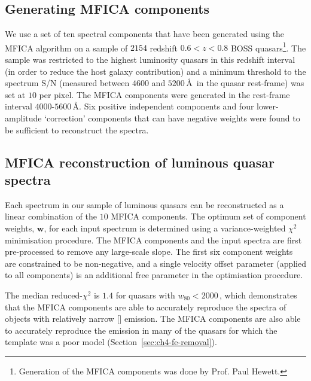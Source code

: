 \subsection{Generating MFICA components}

We use a set of ten spectral components that have been generated using the MFICA algorithm on a sample of $2154$ redshift $0.6 < z < 0.8$ BOSS quasars\footnote{Generation of the MFICA components was done by Prof. Paul Hewett.}.
The sample was restricted to the highest luminosity quasars in this redshift interval (in order to reduce the host galaxy contribution) and a minimum threshold to the spectrum S/N (measured between $4600$ and $5200$\,\AA\, in the quasar rest-frame) was set at $10$ per pixel.
The MFICA components were generated in the rest-frame interval $4000$-$5600$\,\AA.
Six positive independent components and four lower-amplitude `correction' components that can have negative weights were found to be sufficient to reconstruct the spectra. 

\subsection{MFICA reconstruction of luminous quasar spectra}

Each spectrum in our sample of luminous quasars can be reconstructed as a linear combination of the $10$ MFICA components. 
The optimum set of component weights, $\mathbf{w}$, for each input spectrum is determined using a variance-weighted $\chi^2$ minimisation procedure. 
The MFICA components and the input spectra are first pre-processed to remove any large-scale slope.  
The first six component weights are constrained to be non-negative, and a single velocity offset parameter (applied to all components) is an additional free parameter in the optimisation procedure. 

The median reduced-$\chi^2$ is $1.4$ for quasars with $w_{80} < 2000$\,\kms, which demonstrates that the MFICA components are able to accurately reproduce the spectra of objects with relatively narrow [] emission.  
The MFICA components are also able to accurately reproduce the  emission in many of the quasars for which the \citet{boroson92} template was a poor model (Section~\ref{sec:ch4-fe-removal}). 

